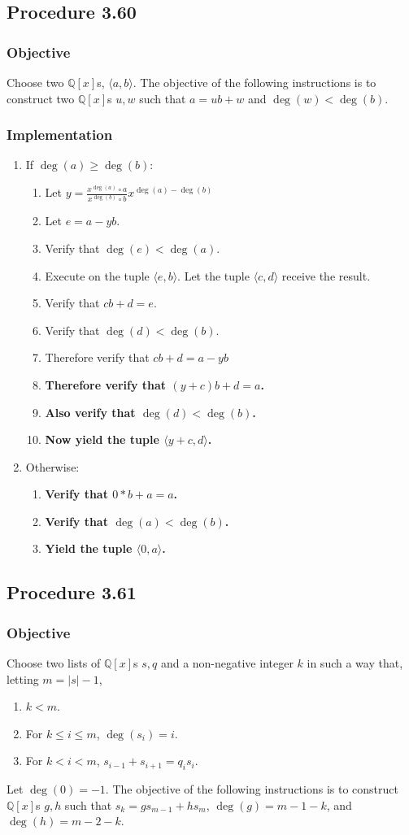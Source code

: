 \documentclass[twocolumn]{article}
\newcommand{\procedure}[2][]{\subsection*{Procedure #2 \ifthenelse{\equal{#1}{}}{}{(#1)}}\label{sec:procedure #2}}
\newcommand{\objective}{\subsubsection*{Objective}}
\newcommand{\implementation}{\subsubsection*{Implementation}}
\newcommand{\procedurehr}[2][]{\hyperref[sec:procedure #2]{\ifthenelse{\equal{#1}{}}{procedure #2}{#1}}}
\begin{document}
		\procedure{3.60}
			\objective
				Choose two $\mathbb{Q}[x]$s, $\langle a,b\rangle$. The objective of the following instructions is to construct two $\mathbb{Q}[x]$s $u,w$ such that $a=ub+w$ and $\deg(w)<\deg(b)$.
			\implementation
				\begin{enumerate}
					\item If $\deg(a)\ge\deg(b)$:
					\begin{enumerate}
						\item Let $y=\frac{x^{\deg(a)}\circ a}{x^{\deg(b)}\circ b}x^{\deg(a)-\deg(b)}$
						\item Let $e=a-yb$.
						\item Verify that $\deg(e)<\deg(a)$.
						\item Execute \procedurehr{3.60} on the tuple $\langle e,b\rangle$. Let the tuple $\langle c,d\rangle$ receive the result.
						\item Verify that $cb+d=e$.
						\item Verify that $\deg(d)<\deg(b)$.
						\item Therefore verify that $cb+d=a-yb$
						\item \textbf{Therefore verify that $(y+c)b+d=a$.}
						\item \textbf{Also verify that $\deg(d)<\deg(b)$.}
						\item \textbf{Now yield the tuple $\langle y+c, d\rangle$.}
					\end{enumerate}
					\item Otherwise:
					\begin{enumerate}
						\item \textbf{Verify that $0*b+a=a$.}
						\item \textbf{Verify that $\deg(a)<\deg(b)$.}
						\item \textbf{Yield the tuple $\langle 0,a\rangle$.}
					\end{enumerate}
				\end{enumerate}
		\procedure{3.61}
			\objective
				Choose two lists of $\mathbb{Q}[x]$s $s,q$ and a non-negative integer $k$ in such a way that, letting $m=\lvert s\rvert-1$,
				\begin{enumerate}
					\item $k<m$.
					\item For $k\le i\le m$, $\deg(s_i)=i$.
					\item For $k<i<m$, $s_{i-1}+s_{i+1}=q_is_i$.
				\end{enumerate}
				Let $\deg(0)=-1$. The objective of the following instructions is to construct $\mathbb{Q}[x]$s $g,h$ such that $s_k=gs_{m-1}+hs_m$, $\deg(g)=m-1-k$, and $\deg(h)=m-2-k$.
\end{document}
